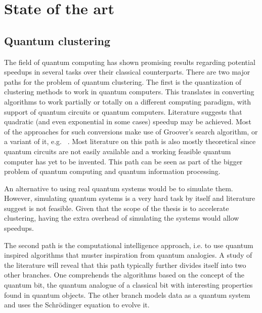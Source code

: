 
\section{State of the art}



\subsection{Quantum clustering}
The field of quantum computing has shown promising results regarding potential speedups in several tasks over their classical counterparts. 
There are two major paths for the problem of quantum clustering. The first is the quantization of clustering methods to work in quantum computers. This translates in converting algorithms to work partially or totally on a different computing paradigm, with support of quantum circuits or quantum computers. Literature suggests that quadratic (and even exponential in some cases) speedup may be achieved. Most of the approaches for such conversions make use of Groover's search algorithm, or a variant of it, e.g. ~\cite{Wiebe2014}. Most literature on this path is also mostly theoretical since quantum circuits are not easily available and a working feasible quantum computer has yet to be invented. This path can be seen as part of the bigger problem of quantum computing and quantum information processing.


An alternative to using real quantum systems would be to simulate them. However, simulating quantum systems is a very hard task by itself and literature suggest is not feasible. Given that the scope of the thesis is to accelerate clustering, having the extra overhead of simulating the systems would allow speedups.

The second path is the computational intelligence approach, i.e.  to use quantum inspired algorithms that muster inspiration from quantum analogies. A study of the literature will reveal that this path typically further divides itself into two other branches. One comprehends the algorithms based on the concept of the quantum bit, the quantum analogue of a classical bit with interesting properties found in quantum objects. The other branch models data as a quantum system and uses the Schrödinger equation to evolve it.


